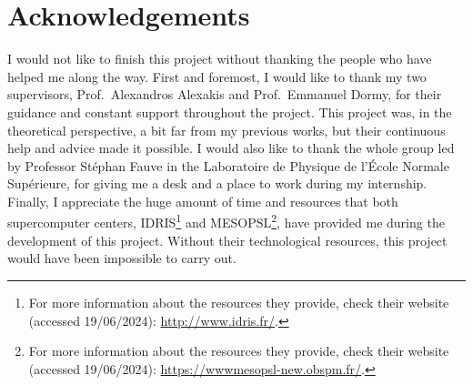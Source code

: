 \documentclass[../main.tex]{subfiles}
\begin{document}
\section*{Acknowledgements}
I would not like to finish this project without thanking the people who have helped me along the way. First and foremost, I would like to thank my two supervisors, Prof.\ Alexandros Alexakis and Prof.\ Emmanuel Dormy, for their guidance and constant support throughout the project. This project was, in the theoretical perspective, a bit far from my previous works, but their continuous help and advice made it possible. I would also like to thank the whole group led by Professor Stéphan Fauve in the Laboratoire de Physique de l'École Normale Supérieure, for giving me a desk and a place to work during my internship. Finally, I appreciate the huge amount of time and resources that both supercomputer centers, IDRIS\footnote{For more information about the resources they provide, check their website (accessed 19/06/2024): \url{http://www.idris.fr/}.} and MESOPSL\footnote{For more information about the resources they provide, check their website (accessed 19/06/2024): \url{https://wwwmesopsl-new.obspm.fr/}.}, have provided me during the development of this project. Without their technological resources, this project would have been impossible to carry out.
\end{document}
